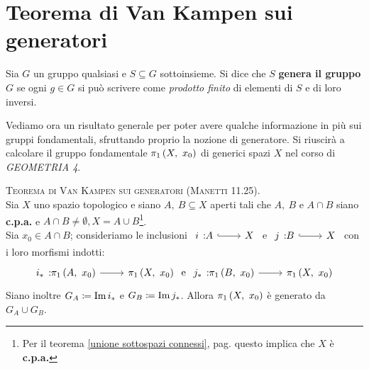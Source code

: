 \section{Teorema di Van Kampen sui generatori}
\begin{remember}
	Sia $G$ un gruppo qualsiasi e $S\subseteq G$ sottoinsieme. Si dice che $S$ \textbf{genera il gruppo} $G$ se ogni $g\in G$ si può scrivere come \textit{prodotto finito} di elementi di $S$ e di loro inversi. 
\end{remember}
Vediamo ora un risultato generale per poter avere qualche informazione in più sui gruppi fondamentali, sfruttando proprio la nozione di generatore. Si riuscirà a calcolare il gruppo fondamentale $\gruf{X}{x_0}$ di generici spazi $X$ nel corso di \textit{GEOMETRIA 4}.
\begin{theorema} \textsc{Teorema di Van Kampen sui generatori (Manetti 11.25).} \label{Van Kampen} \\
	Sia $X$ uno spazio topologico e siano $A,\ B\subseteq X$ aperti tali che $A,\ B$ e $A\cap B$ siano \textbf{c.p.a.} e $A\cap B\neq\emptyset, X=A\cup B$\footnote{Per il teorema \ref{unione sottospazi connessi}, pag. \pageref{unione sottospazi connessi} questo implica che $X$ è \textbf{c.p.a.}}. \\
	Sia $x_0\in A\cap B$; consideriamo le inclusioni $\incl i A X$ e $\incl j B X$ con i loro morfismi indotti:
	\begin{equation}
		\funz {i_\ast} {\gruf{A}{x_0}} {\gruf{X}{x_0}}\text{ e }\funz {j_\ast} {\gruf{B}{x_0}} {\gruf{X}{x_0}}
	\end{equation}
	Siano inoltre $G_A\coloneqq \operatorname{Im} i_\ast$ e $G_B\coloneqq \operatorname{Im} j_\ast$. Allora $\gruf{X}{x_0}$ è generato da $G_A\cup G_B$.
\end{theorema}

